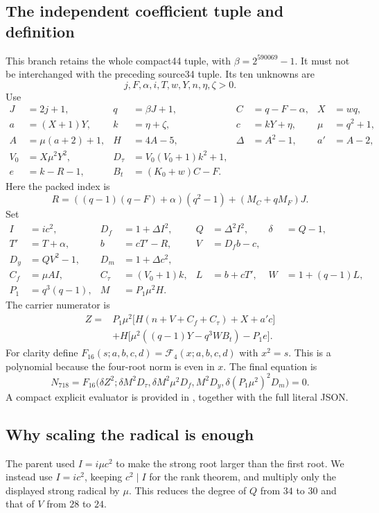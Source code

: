 \documentclass[11pt,letterpaper]{article}
\theoremstyle{definition}\newtheorem{definition}[theorem]{Definition}
\theoremstyle{remark}\newtheorem{remark}[theorem]{Remark}
\begin{document}
\subsection{The independent coefficient tuple and definition}
This branch retains the whole compact44 tuple, with $\beta=2^{590069}-1$. It must not be interchanged with the preceding source34 tuple. Its ten unknowns are
\[
 j,F,\alpha,i,T,w,Y,n,\eta,\zeta>0.
\]
Use
\begin{align*}
 J&=2j+1,&q&=\beta J+1,&C&=q-F-\alpha,&X&=wq,\\
 a&=(X+1)Y,&k&=\eta+\zeta,&c&=kY+\eta,&\mu&=q^2+1,\\
 A&=\mu(a+2)+1,&H&=4A-5,&\Delta&=A^2-1,&a'&=A-2,\\
 V_0&=X\mu^2Y^2,&D_\tau&=V_0(V_0+1)k^2+1,\\
 e&=k-R-1,&B_t&=(K_0+w)C-F.
\end{align*}
Here the packed index is
\[
 R=((q-1)(q-F)+\alpha)(q^2-1)+(M_C+qM_F)J.
\]
Set
\begin{align*}
 I&=ic^2,&D_f&=1+\Delta I^2,&Q&=\Delta^2I^2,&\delta&=Q-1,\\
 T'&=T+\alpha,&b&=cT'-R,&V&=D_fb-c,\\
 D_y&=QV^2-1,&D_m&=1+\Delta c^2,\\
 C_f&=\mu AI,&C_\tau&=(V_0+1)k,&L&=b+cT',&W&=1+(q-1)L,\\
 P_1&=q^3(q-1),&M&=P_1\mu^2H.
\end{align*}
The carrier numerator is
\begin{align*}
 Z={}&P_1\mu^2\bigl[H(n+V+C_f+C_\tau)+X+a'c\bigr]\\
 &+H\bigl[\mu^2((q-1)Y-q^3WB_t)-P_1e\bigr].
\end{align*}
For clarity define $F_{16}(s;a,b,c,d)=\mathcal F_4(x;a,b,c,d)$ with $x^2=s$. This is a polynomial because the four-root norm is even in $x$. The final equation is
\[
 \boxed{N_{718}=F_{16}\bigl(\delta Z^2;
 \delta M^2D_\tau,\delta M^2\mu^2D_f,M^2D_y,
 \delta(P_1\mu^2)^2D_m\bigr)=0.}
 \tag{13}\label{eq:positive10}
\]
A compact explicit evaluator is provided in , together with the full literal JSON.

\subsection{Why scaling the radical is enough}
The parent used $I=i\mu c^2$ to make the strong root larger than the first root. We instead use $I=ic^2$, keeping $c^2\mid I$ for the rank theorem, and multiply only the displayed strong radical by $\mu$. This reduces the degree of $Q$ from $34$ to $30$ and that of $V$ from $28$ to $24$.
\end{document}

